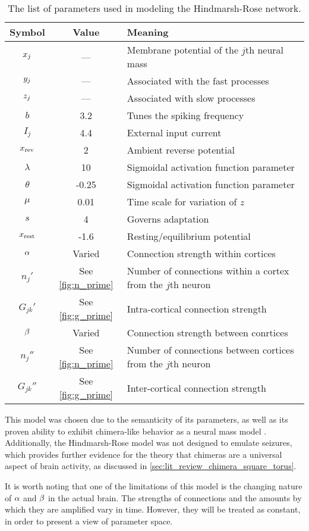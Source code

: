 \begin{table}[ht]
  \centering
  \begin{tabular}{c | c | l}
    Symbol & Value & Meaning \\ \hline
    $x_{j}$ & --- & Membrane potential of the $j$th neural mass \\
    $y_{j}$ & --- & Associated with the fast processes \\
    $z_{j}$ & --- & Associated with slow processes \\ \hline
    $b$ & 3.2 & Tunes the spiking frequency \\
    $I_{j}$ & 4.4 & External input current \\
    $x_{\text{rev}}$ & 2 & Ambient reverse potential \\
    $\lambda$ & 10 & Sigmoidal activation function parameter \\
    $\theta$ & -0.25 & Sigmoidal activation function parameter \\
    $\mu$ & 0.01 & Time scale for variation of $z$ \\
    $s$ & 4 & Governs adaptation \\
    $x_{\text{rest}}$ & -1.6 & Resting/equilibrium potential \\ \hline
    $\alpha$ & Varied & Connection strength within cortices \\
    $n_{j}'$ & See \cref{fig:n_prime} & Number of connections within a cortex from the $j$th neuron \\
    $G_{j k}'$ & See \cref{fig:g_prime} & Intra-cortical connection strength \\
    $\beta$ & Varied & Connection strength between conrtices \\
    $n_{j}''$ & See \cref{fig:n_prime} & Number of connections between cortices from the $j$th neuron \\
    $G_{j k}''$ & See \cref{fig:g_prime} & Inter-cortical connection strength
  \end{tabular}
  \caption[Hindmarsh-Rose Parameters]{The list of parameters used in modeling the Hindmarsh-Rose network.}
  \label{tab:hr_params}
\end{table}

This model was chosen due to the semanticity of its parameters, as well as its proven ability to exhibit chimera-like behavior as a neural mass model \cite{Santos2017}.
Additionally, the Hindmarsh-Rose model was not designed to emulate seizures, which provides further evidence for the theory that chimeras are a universal aspect of brain activity, as discussed in \cref{sec:lit_review_chimera_square_torus}.

It is worth noting that one of the limitations of this model is the changing nature of $\alpha$ and $\beta$ in the actual brain.
The strengths of connections and the amounts by which they are amplified vary in time.
However, they will be treated as constant, in order to present a view of parameter space.

